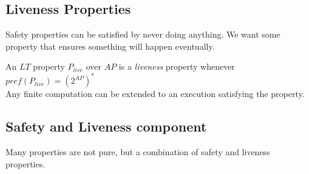 \documentclass[a4paper, 10pt]{article}
\begin{document}
\subsection*{Liveness Properties}
Safety properties can be satisfied by never doing anything. \follows \; We want some property that ensures something will happen eventually.
\begin{shaded}
    An $LT$ property $P_{live}$ over $AP$ is a \emph{liveness} property whenever $pref(P_{live})=(2^{AP})^*$ \\
    {\tiny \follows Any finite computation can be extended to an execution satisfying the property.}
\end{shaded}

\subsection*{Safety and Liveness component}
Many properties are not pure, but a combination of safety and liveness properties.
\end{document}
